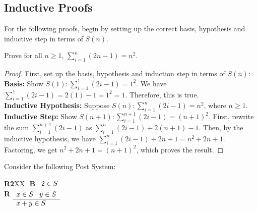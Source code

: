 \documentclass[]{exam}
\begin{document}
\begin{questions}
\section*{Inductive Proofs}
For the following proofs, begin by setting up the correct basis, hypothesis
and inductive step in terms of $S(n)$.


\question Prove for all $n \geq 1$, $\sum_{i=1}^{n} (2n - 1) = n^2$. 
\begin{solution}
\begin{proof}
First, set up the basis, hypothesis and induction step in terms of $S(n)$:
~\\
\textbf{Basis:} Show $S(1): \sum_{i=1}^1 (2i - 1) = 1^2$. We have $ \sum_{i=1}^1
(2i - 1) = 2(1) - 1 = 1^2 = 1$. Therefore, this is true.
~\\
\textbf{Inductive Hypothesis:} Suppose $S(n): \sum_{i=1}^{n}(2i - 1) = n^2$, 
  where $n \geq 1$.
~\\
\textbf{Inductive Step:} Show $S(n+1): \sum_{i=1}^{n+1} (2i - 1) = (n + 1)^2$. 
First, rewrite the sum $\sum_{i=1}^{n+1} (2i - 1)$ as $\sum_{i=1}^{n}
(2i - 1) + 2(n+1) - 1$. Then, by the inductive hypothesis, we have $\sum_{i=1}^{n}
(2i - 1) + 2n + 1 = n^2 + 2n + 1$. Factoring, we get $n^2 + 2n + 1 = (n + 1)^2$,
which proves the result.
\end{proof}

\end{solution}

\question Consider the following Post System:
\begin{tabbing}
{\bf R2}XX \=  \kill
{\bf B} \>
        \(\begin{array}[t]{l}
        2\in S
        \end{array}\) \\[2ex]
{\bf R} \>
        \(\begin{array}[t]{l}
        x \in S \;\;\;y \in S \\
        \hline
        x + y \in S
        \end{array}\)
\end{tabbing}


\end{questions}
\end{document}

